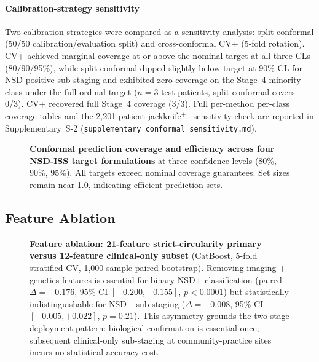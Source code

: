 \documentclass[10pt,letterpaper]{article}
\begin{document}
\paragraph*{Calibration-strategy sensitivity} Two calibration strategies were compared as a sensitivity analysis: split conformal (50/50 calibration/evaluation split) and cross-conformal CV+ (5-fold rotation). CV+ achieved marginal coverage at or above the nominal target at all three CLs (80/90/95\%), while split conformal dipped slightly below target at 90\% CL for NSD-positive sub-staging and exhibited zero coverage on the Stage~4 minority class under the full-ordinal target ($n{=}3$ test patients, split conformal covers 0/3). CV+ recovered full Stage~4 coverage (3/3). Full per-method per-class coverage tables and the 2{,}201-patient jackknife$^+$~\cite{barber2021jackknife} sensitivity check are reported in Supplementary~S-2 (\texttt{supplementary\_conformal\_sensitivity.md}).

\begin{figure}[!t]

\caption{\textbf{Conformal prediction coverage and efficiency across four NSD-ISS target formulations} at three confidence levels (80\%, 90\%, 95\%). All targets exceed nominal coverage guarantees. Set sizes remain near 1.0, indicating efficient prediction sets.}
\label{p1:fig:conformal}
\end{figure}

\subsection*{Feature Ablation}
\label{p1:sec:results:ablation}

\begin{figure}[!t]

\caption{\textbf{Feature ablation: 21-feature strict-circularity primary versus 12-feature clinical-only subset} (CatBoost, 5-fold stratified CV, 1{,}000-sample paired bootstrap). Removing imaging + genetics features is essential for binary NSD$+$ classification (paired $\Delta{=}-0.176$, 95\% CI $[-0.200,-0.155]$, $p{<}0.0001$) but statistically indistinguishable for NSD$+$ sub-staging ($\Delta{=}+0.008$, 95\% CI $[-0.005,+0.022]$, $p{=}0.21$). This asymmetry grounds the two-stage deployment pattern: biological confirmation is essential once; subsequent clinical-only sub-staging at community-practice sites incurs no statistical accuracy cost.}
\label{p1:fig:ablation}
\end{figure}
\end{document}
